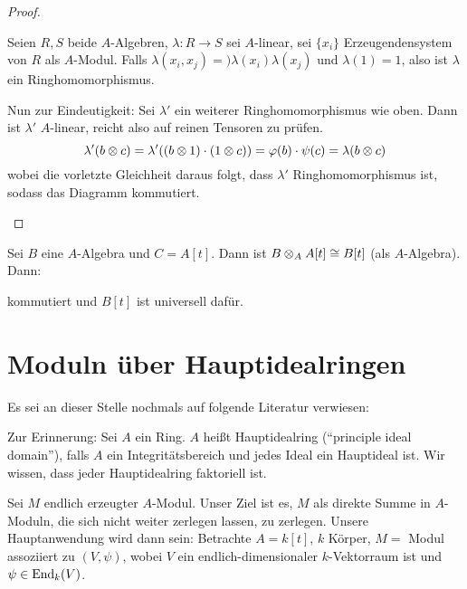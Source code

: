 \documentclass[12pt,a4paper]{scrartcl}
\theoremstyle{cplain}
\theoremstyle{cdef}
\begin{document}
\begin{proof}
\begin{enumerate}[label=\ref{thm:314:\roman*}]
		\begin{bem}
			Seien $R,S$ beide $A$-Algebren, $\lambda\colon R\to S$ sei $A$-linear, sei $\{x_i\}$ Erzeugendensystem von $R$ als $A$-Modul. Falls $\lambda(x_i,x_j) =)\lambda(x_i)\lambda(x_j)$ und $\lambda(1) = 1$, also ist $\lambda$ ein Ringhomomorphismus.
		\end{bem}
	
		Nun zur Eindeutigkeit: Sei $\lambda'$ ein weiterer Ringhomomorphismus wie oben. Dann ist $\lambda'$ $A$-linear, reicht also auf reinen Tensoren zu prüfen.
		\[\lambda'(b\otimes c) = \lambda'((b\otimes 1)\cdot(1\otimes c)) = \varphi(b)\cdot \psi(c) = \lambda(b\otimes c)\]
		wobei die vorletzte Gleichheit daraus folgt, dass $\lambda'$ Ringhomomorphismus ist, sodass das Diagramm kommutiert.
		\qedhere
	\end{enumerate}
\end{proof}

\begin{bsp}
	Sei $B$ eine $A$-Algebra und $C= A[t]$. Dann ist $B\otimes_AA[t]\cong B[t]$ (als $A$-Algebra). Dann:	
	\begin{center}
	\end{center}
	kommutiert und $B[t]$ ist universell dafür.
\end{bsp}


\section{Moduln über Hauptidealringen}
\label{sec:moduln ueber hir}

Es sei an dieser Stelle nochmals auf folgende Literatur verwiesen:

\printbibliography[keyword=moduln-hir,heading=none]

Zur Erinnerung: Sei $A$ ein Ring. $A$ heißt Hauptidealring (\enquote{principle ideal domain}), falls $A$ ein Integritätsbereich und jedes Ideal ein Hauptideal ist. Wir wissen, dass jeder Hauptidealring faktoriell ist.

Sei $M$ endlich erzeugter $A$-Modul. Unser Ziel ist es, $M$ als direkte Summe in $A$-Moduln, die sich nicht weiter zerlegen lassen, zu zerlegen. Unsere Hauptanwendung wird dann sein: Betrachte $A = k[t]$, $k$ Körper, $M=$ Modul assoziiert zu $(V,\psi)$, wobei $V$ ein endlich-dimensionaler $k$-Vektorraum ist und $\psi\in\operatorname{End}_k(V)$.
\end{document}
